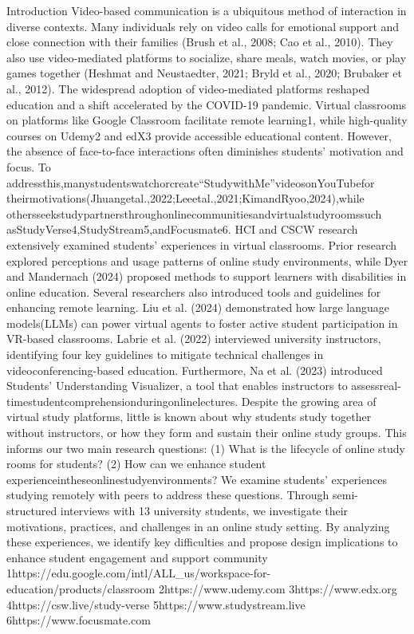 \documentclass[12pt]{ctexart}
\begin{document}
Introduction
Video-based communication is a ubiquitous method of interaction in diverse
contexts. Many individuals rely on video calls for emotional support and close
connection with their families (Brush et al., 2008; Cao et al., 2010). They also use
video-mediated platforms to socialize, share meals, watch movies, or play games
together (Heshmat and Neustaedter, 2021; Bryld et al., 2020; Brubaker et al.,
2012).
The widespread adoption of video-mediated platforms reshaped education and
a shift accelerated by the COVID-19 pandemic. Virtual classrooms on platforms
like Google Classroom facilitate remote learning1, while high-quality courses on
Udemy2 and edX3 provide accessible educational content. However, the absence
of face-to-face interactions often diminishes students’ motivation and focus. To
addressthis,manystudentswatchorcreate“StudywithMe”videosonYouTubefor
theirmotivations(Jhuangetal.,2022;Leeetal.,2021;KimandRyoo,2024),while
othersseekstudypartnersthroughonlinecommunitiesandvirtualstudyroomssuch
asStudyVerse4,StudyStream5,andFocusmate6.
HCI and CSCW research extensively examined students’ experiences in virtual
classrooms. Prior research explored perceptions and usage patterns of online study
environments, while Dyer and Mandernach (2024) proposed methods to support
learners with disabilities in online education. Several researchers also introduced
tools and guidelines for enhancing remote learning. Liu et al. (2024) demonstrated
how large language models(LLMs) can power virtual agents to foster active
student participation in VR-based classrooms. Labrie et al. (2022) interviewed
university instructors, identifying four key guidelines to mitigate technical
challenges in videoconferencing-based education. Furthermore, Na et al. (2023)
introduced Students’ Understanding Visualizer, a tool that enables instructors to
assessreal-timestudentcomprehensionduringonlinelectures.
Despite the growing area of virtual study platforms, little is known about why
students study together without instructors, or how they form and sustain their
online study groups. This informs our two main research questions: (1) What is
the lifecycle of online study rooms for students? (2) How can we enhance student
experienceintheseonlinestudyenvironments?
We examine students’ experiences studying remotely with peers to address
these questions. Through semi-structured interviews with 13 university students,
we investigate their motivations, practices, and challenges in an online study
setting. By analyzing these experiences, we identify key difficulties and propose
design implications to enhance student engagement and support community
1https://edu.google.com/intl/ALL\_us/workspace-for-education/products/classroom
2https://www.udemy.com
3https://www.edx.org
4https://csw.live/study-verse
5https://www.studystream.live
6https://www.focusmate.com
\end{document}
